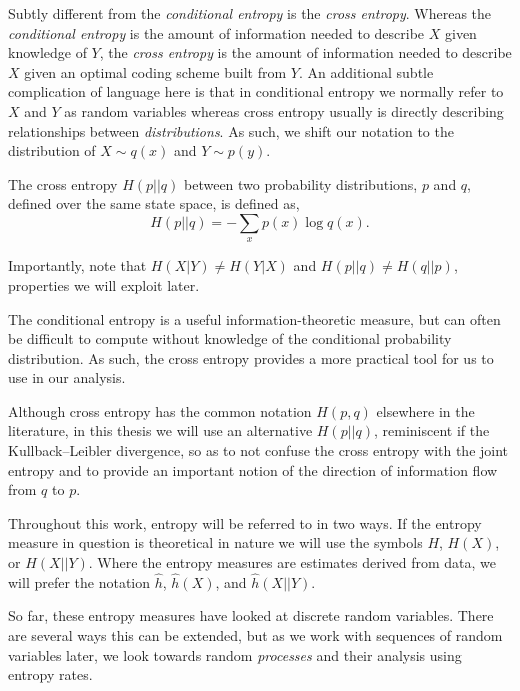 Subtly different from the \emph{conditional entropy} is the \emph{cross entropy}. Whereas the \emph{conditional entropy} is the amount of information needed to describe $X$ given knowledge of $Y$, the \emph{cross entropy} is the amount of information needed to describe $X$ given an optimal coding scheme built from $Y.$ An additional subtle complication of language here is that in conditional entropy we normally refer to $X$ and $Y$ as random variables whereas cross entropy usually is directly describing relationships between \emph{distributions}. As such, we shift our notation to the distribution of $X \sim q(x)$ and $Y \sim p(y)$.

\begin{definition}\label{def:crossentropy}
	The cross entropy $H(p||q)$ between two probability distributions, $p$ and $q$, defined over the same state space, is defined as, 
	\begin{equation}
	H (p||q)= - \sum_{x} p(x) \log {q(x)}.
	\end{equation}
\end{definition}

\begin{remark}
	Importantly, note that $H(X|Y) \neq  H(Y|X)$ and $H(p||q) \neq H (q||p)$, properties we will exploit later.
\end{remark}

The conditional entropy is a useful information-theoretic measure, but can often be difficult to compute without knowledge of the conditional probability distribution. As such, the cross entropy provides a more practical tool for us to use in our analysis.

Although cross entropy has the common notation $H(p, q)$ elsewhere in the literature, in this thesis we will use an alternative $H(p||q)$, reminiscent if the Kullback–Leibler divergence, so as to not confuse the cross entropy with the joint entropy and to provide an important notion of the direction of information flow from $q$ to $p$.

Throughout this work, entropy will be referred to in two ways. If the entropy measure in question is theoretical in nature we will use the symbols $H$, $H(X)$, or $H(X||Y)$. Where the entropy measures are estimates derived from data, we will prefer the notation $\hat{h}$, $\hat{h}(X)$, and $\hat{h}(X||Y)$. 


So far, these entropy measures have looked at discrete random variables. There are several ways this can be extended, but as we work with sequences of random variables later, we look towards random \emph{processes} and their analysis using entropy rates.

